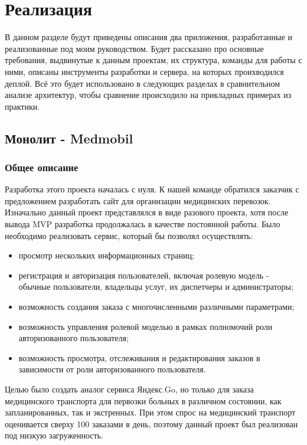 \section{Реализация}

    В данном разделе будут приведены описания два приложения, разработанные и реализованные под моим руководством. Будет рассказано про основные требования, выдвинутые к данным проектам, их структура, команды для работы с ними, описаны инструменты разработки и сервера, на которых проихводился деплой. Всё это будет использовано в следующих разделах в сравнительном анализе архитектур, чтобы сравнение происходило на прикладных примерах из практики.

\subsection{Монолит - Medmobil}

    \subsubsection{Общее описание}
    Разработка этого проекта началась с нуля. К нашей команде обратился заказчик с предложением разработать сайт для организации медицинских перевозок. Изначально данный проект представлялся в виде разового проекта, хотя после вывода MVP разработка продолжалась в качестве постоянной работы. Было необходимо реализовать сервис, который бы позволял осуществлять:
    \begin{itemize}
        \item просмотр нескольких информационных страниц;
        \item регистрация и авторизация пользователей, включая ролевую модель - обычные пользователи, владельцы услуг, их диспетчеры и администраторы;
        \item возможность создания заказа с многочисленными различными параметрами;
        \item возможность управления ролевой моделью в рамках полномочий роли авторизованного пользователя;
        \item возможность просмотра, отслеживания и редактирования заказов в зависимости от роли авторизованного пользователя.
    \end{itemize}
    Целью было создать аналог сервиса Яндекс.Go, но только для заказа медицинского транспорта для первозки больных в различном состоянии, как запланированных, так и экстренных. При этом спрос на медицинский транспорт оценивается сверху 100 заказами в день, поэтому данный проект был реализован под низкую загруженность.

